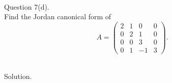 \documentclass{article}
\begin{document}
\bigskip


\newpage

\hfill \break  $~\!\!$ \dotfill \medskip \\
\textnormal{Question 7(d).}\\
Find the Jordan canonical form of
\[
A = \begin{pmatrix} 2 & 1 & 0 & 0 \\ 0 & 2 & 1 & 0 \\ 0 & 0 & 3 & 0 \\ 0 & 1 & -1 & 3 \end{pmatrix}.
\]

\noindent\\
\textnormal{Solution.}\\
\quad\\
\end{document}
